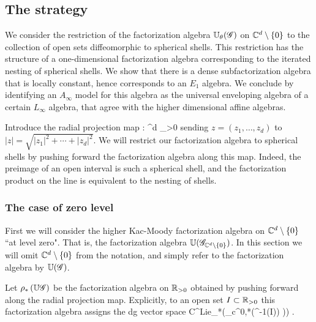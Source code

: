 
\subsection{The strategy}

We consider the restriction of the factorization algebra $\mathbb U_\theta (\mathscr G)$ on $\mathbb C^{d} \setminus \{0\}$ to the collection of open sets diffeomorphic to spherical shells.
This restriction has the structure of a one-dimensional factorization algebra corresponding to the iterated nesting of spherical shells. 
We show that there is a dense subfactorization algebra that is locally constant, hence corresponds to an $E_1$ algebra.
We conclude by identifying an $A_\infty$ model for this algebra as the universal enveloping algebra of a certain $L_\infty$ algebra, that agree with the higher dimensional affine algebras.

Introduce the radial projection map
\ben
\rho : \CC^d  \to \RR_{>0}
\een
sending $z = (z_1, \ldots, z_d)$ to $|z| = \sqrt{|z_1|^2 + \cdots + |z_d|^2}$. 
We will restrict our factorization algebra to spherical shells by pushing forward the factorization algebra along this map.
Indeed, the preimage of an open interval is such a spherical shell, and the factorization product on the line is equivalent to the nesting of shells. 

\subsubsection{The case of zero level}

First we will consider the higher Kac-Moody factorization algebra on $\mathbb C^d \setminus \{0\}$ ``at level zero". That is, the factorization algebra $\mathbb U(\mathscr G_{\mathbb C^d \setminus\{0\}})$.
In this section we will omit $\mathbb C^d \setminus \{0\}$ from the notation, and simply refer to the factorization algebra by $\mathbb U(\mathscr G)$. 

Let $\rho_* \left(\mathbb U \mathscr G \right)$ be the factorization algebra on $\mathbb R_{>0}$ obtained by pushing forward along the radial projection map. Explicitly, to an open set $I \subset \mathbb R_{>0}$ this factorization algebra assigns the dg vector space
\ben
{\rm C}^{\rm Lie}_*\left(\Omega_c^{0,*}(\rho^{-1}(I)) \tensor \fg)\right) .
\een

